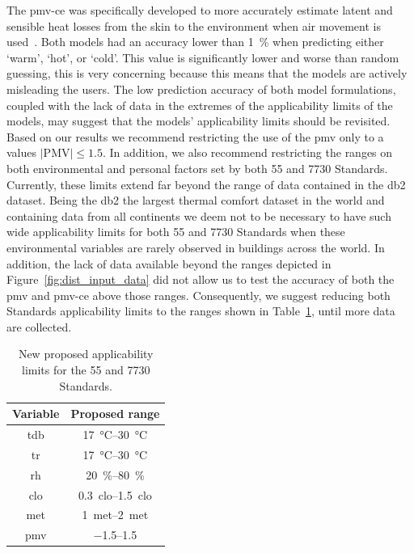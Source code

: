 The \ac{pmv-ce} was specifically developed to more accurately estimate latent and sensible heat losses from the skin to the environment when air movement is used~\cite{arens_moving_2009}.
Both models had an accuracy lower than \qty{1}{\percent} when predicting either `warm', `hot', or `cold'.
This value is significantly lower and worse than random guessing, this is very concerning because this means that the models are actively misleading the users.
The low prediction accuracy of both model formulations, coupled with the lack of data in the extremes of the applicability limits of the models, may suggest that the models' applicability limits should be revisited.
Based on our results we recommend restricting the use of the \ac{pmv} only to a values $\lvert \textrm{PMV}\lvert \leq 1.5$.
In addition, we also recommend restricting the ranges on both environmental and personal factors set by both \gls{55} and \gls{7730} Standards.
Currently, these limits extend far beyond the range of data contained in the \ac{db2} dataset.
Being the \ac{db2} the largest thermal comfort dataset in the world and containing data from all continents we deem not to be necessary to have such wide applicability limits for both \gls{55} and \gls{7730} Standards when these environmental variables are rarely observed in buildings across the world.
In addition, the lack of data available beyond the ranges depicted in Figure~\ref{fig:dist_input_data} did not allow us to test the accuracy of both the \ac{pmv} and \ac{pmv-ce} above those ranges.
Consequently, we suggest reducing both Standards applicability limits to the ranges shown in Table~\ref{tab:ranges}, until more data are collected.
\begin{table}[htb!]
    \centering
    \begin{tabular}{cc}
        \toprule
        Variable & Proposed range \\
        \midrule
        \ac{tdb} & \qtyrange{17}{30}{\celsius} \\
        \ac{tr} & \qtyrange{17}{30}{\celsius} \\
        \ac{rh} & \qtyrange{20}{80}{\percent} \\
        \ac{clo} & \qtyrange{0.3}{1.5}{clo} \\
        \ac{met} & \qtyrange{1}{2}{met} \\
        \ac{pmv} & \qtyrange{-1.5}{1.5}{} \\
        \bottomrule
    \end{tabular}
    \caption{New proposed applicability limits for the \gls{55} and \gls{7730} Standards.}
    \label{tab:ranges}
\end{table}
